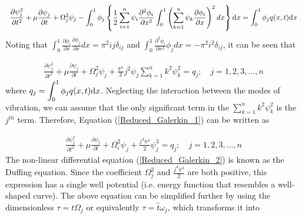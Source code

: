\documentclass[3p,doublespacing,authoryear,11pt]{elsarticle} %
\begin{document}
 \begin{equation}\label{Reduced_Galerkin_0}
 \begin{array}{l } 
\displaystyle  \frac{\partial {\psi}_j^2}{\partial t^2}  +  \mu \frac{\partial {\psi}_j}{\partial t}   +  \Omega_j^2 \psi_j  - \int_0^1 \phi_j \left \{\frac{1}{2}  \sum_{i=1}^n  \psi_i  \frac{\partial^2 \phi_i}{\partial x^2} \int_0^1 \left(   \sum_{k=1}^n  \psi_k \frac{\partial \phi_i}{\partial x} \right)^2 dx  \right \} \textup{d} x =\int_0^1 \phi_j  q (x,t) \textup{d} x
  \end{array}  
\end{equation}
Noting that $\displaystyle \int_0^1  \frac{\partial \phi_i}{\partial x}  \frac{\partial \phi_j}{\partial x}  dx =\pi^2 ij \delta_{ij}$ and $\displaystyle \int_0^1  \frac{\partial^2 \phi_i}{\partial x^2}   \phi_j  dx =-\pi^2 i^2 \delta_{ij}$, it can be seen that 

 \begin{equation}\label{Reduced_Galerkin_1}
 \begin{array}{l } 
  \displaystyle  \frac{\partial {\psi}_j^2}{\partial t^2}  +  \mu \frac{\partial {\psi}_j}{\partial t}   +  \Omega_j^2 \psi_j  + \frac{\pi^4}{2}  j^2  \psi_j  \sum_{k=1}^n k^2  \psi_k^2  = q_j; \quad j=1,2,3,..., n
  \end{array}  
\end{equation}
where $  \displaystyle  q_j = \int_0^1 \phi_j  q (x,t) \textup{d} x$. Neglecting the interaction between the modes of vibration, we can assume that the only significant term in the $\sum_{k=1}^n k^2  \psi_k^2$ is the $j^{th}$ term. Therefore, Equation (\ref{Reduced_Galerkin_1}) can be written as

 \begin{equation}\label{Reduced_Galerkin_2}
 \begin{array}{l } 
  \displaystyle  \frac{\partial {\psi}_j^2}{\partial t^2}  +  \mu \frac{\partial {\psi}_j}{\partial t}   +  \Omega_i^2 \psi_j  + \frac{ j^4 \pi^4}{2}  \psi_j^3  =q_j; \quad j=1,2,3,..., n
  \end{array}  
\end{equation}
The non-linear differential equation (\ref{Reduced_Galerkin_2}) is known as the Duffing equation. Since the coefficient $\Omega_j^2$ and $\frac{ j^4 \pi^4}{2} $ are both positive, this expression has a single well potential (i.e. energy function that resembles a well-shaped curve). The above equation can be simplified further by using the dimensionless $\tau = t \Omega_j $ or equivalently $ \tau =  \hat{t}  \omega_j$, which transforms it into
\end{document}
